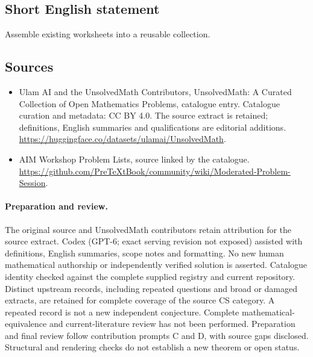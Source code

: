 \documentclass[11pt]{article}
\begin{document}
\subsection{Short English statement}
Assemble existing worksheets into a reusable collection.
\subsection{Sources}
\begin{itemize}
\item[\hypertarget{source:statement:1}{S1}] Ulam AI and the UnsolvedMath Contributors, UnsolvedMath: A Curated Collection of Open Mathematics Problems, catalogue entry. Catalogue curation and metadata: CC BY 4.0. The source extract is retained; definitions, English summaries and qualifications are editorial additions.
\url{https://huggingface.co/datasets/ulamai/UnsolvedMath}.
\item[\hypertarget{source:statement:2}{S2}] AIM Workshop Problem Lists, source linked by the catalogue.
\url{https://github.com/PreTeXtBook/community/wiki/Moderated-Problem-Session}.
\end{itemize}
\paragraph{Preparation and review.}
The original source and UnsolvedMath contributors retain attribution for the source extract. Codex (GPT-6; exact serving revision not exposed) assisted with definitions, English summaries, scope notes and formatting. No new human mathematical authorship or independently verified solution is asserted. Catalogue identity checked against the complete supplied registry and current repository. Distinct upstream records, including repeated questions and broad or damaged extracts, are retained for complete coverage of the source CS category. A repeated record is not a new independent conjecture. Complete mathematical-equivalence and current-literature review has not been performed. Preparation and final review follow contribution prompts C and D, with source gaps disclosed. Structural and rendering checks do not establish a new theorem or open status.
\label{end:statement}
\end{document}
